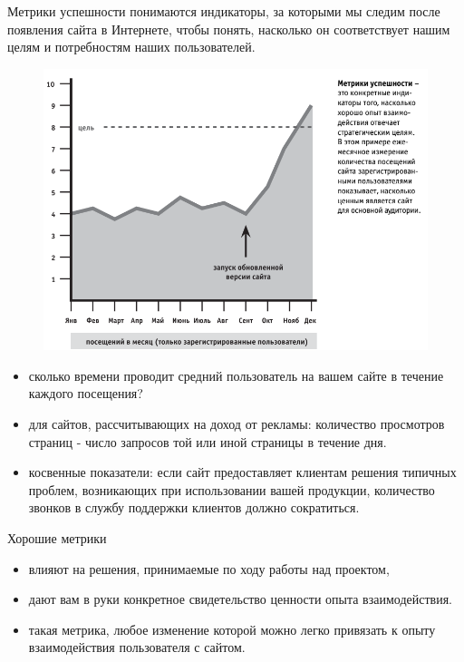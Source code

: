 \documentclass{beamer}
\begin{document}
\begin{frame}
\begin{block}{Метрики успешности}
понимаются индикаторы, за которыми мы следим после появления сайта в Интернете, чтобы понять, насколько он соответствует нашим целям
и потребностям наших пользователей. 
\end{block}
\begin{figure}[h]
\centering
\includegraphics[scale=0.4]{images/lec01-pic14.png}
\end{figure}
\end{frame}

\begin{frame}
\begin{itemize}
\item сколько времени проводит средний пользователь на вашем сайте в течение каждого посещения?
\item для сайтов, рассчитывающих на доход от рекламы: количество просмотров страниц - число запросов той или иной страницы в течение дня.
\item косвенные показатели: если сайт предоставляет клиентам решения типичных проблем, возникающих при использовании вашей
продукции, количество звонков в службу поддержки клиентов должно сократиться.
\end{itemize}
Хорошие метрики
\begin{itemize}
\item влияют на решения, принимаемые по ходу работы над проектом, 
\item дают вам в руки конкретное свидетельство ценности опыта взаимодействия.
\item такая метрика, любое изменение которой можно легко привязать к опыту взаимодействия пользователя с сайтом. 
\end{itemize}
\end{frame}
\end{document}
